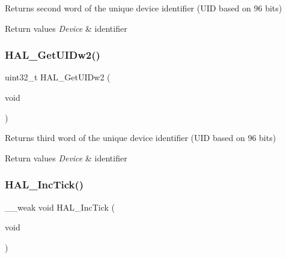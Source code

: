 Returns second word of the unique device identifier (U\+ID based on 96 bits) 


\begin{DoxyRetVals}{Return values}
{\em Device} & identifier \\
\hline
\end{DoxyRetVals}
\mbox{\label{group___h_a_l___exported___functions___group2_ga5785ae5ec8d4c5a7dadb1359f0778700}} 
\subsubsection{\texorpdfstring{H\+A\+L\+\_\+\+Get\+U\+I\+Dw2()}{HAL\_GetUIDw2()}}
{\footnotesize\ttfamily uint32\+\_\+t H\+A\+L\+\_\+\+Get\+U\+I\+Dw2 (\begin{DoxyParamCaption}\item[{void}]{ }\end{DoxyParamCaption})}



Returns third word of the unique device identifier (U\+ID based on 96 bits) 


\begin{DoxyRetVals}{Return values}
{\em Device} & identifier \\
\hline
\end{DoxyRetVals}
\mbox{\label{group___h_a_l___exported___functions___group2_gaba5b726bfedd013bf7bb5a51d5c4f188}} 
\subsubsection{\texorpdfstring{H\+A\+L\+\_\+\+Inc\+Tick()}{HAL\_IncTick()}}
{\footnotesize\ttfamily \+\_\+\+\_\+weak void H\+A\+L\+\_\+\+Inc\+Tick (\begin{DoxyParamCaption}\item[{void}]{ }\end{DoxyParamCaption})}



